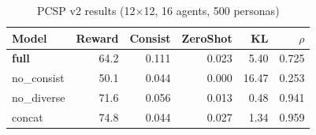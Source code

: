 \begin{table}[t]
\centering
\caption{PCSP v2 results (12$\times$12, 16 agents, 500 personas)}
\label{tab:pcsp_v2}
\begin{tabular}{lrrrrr}
\toprule
Model & Reward & Consist & ZeroShot & KL & $\rho$ \\
\midrule
\textbf{full} & 64.2 & 0.111 & 0.023 & 5.40 & 0.725 \\
no_consist & 50.1 & 0.044 & 0.000 & 16.47 & 0.253 \\
no_diverse & 71.6 & 0.056 & 0.013 & 0.48 & 0.941 \\
concat & 74.8 & 0.044 & 0.027 & 1.34 & 0.959 \\
\bottomrule
\end{tabular}
\end{table}